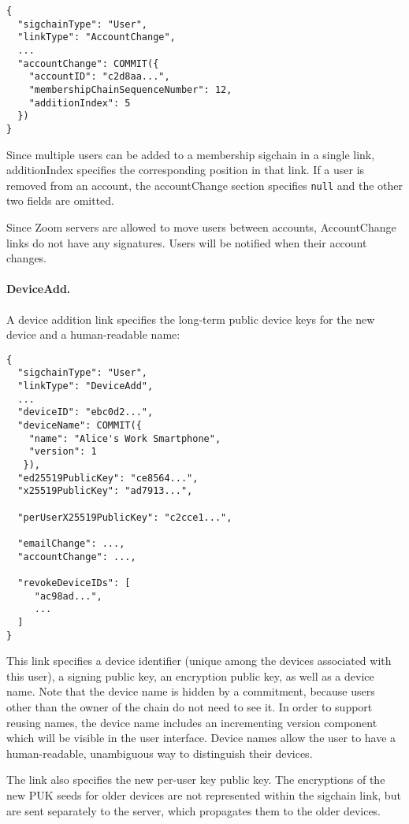 \begin{Verbatim}
{
  "sigchainType": "User",
  "linkType": "AccountChange",
  ...
  "accountChange": COMMIT({
    "accountID": "c2d8aa...",
    "membershipChainSequenceNumber": 12,
    "additionIndex": 5
  })
}
\end{Verbatim}

Since multiple users can be added to a membership sigchain in a single link,
\textsf{additionIndex} specifies the corresponding position in that link. If a user
is removed from an account, the \textsf{accountChange} section specifies \accountID
\texttt{null} and the other two fields are omitted.

Since Zoom servers are allowed to move users between accounts, \textsf{AccountChange} links do
not have any signatures. Users will be notified when their account changes.

\paragraph{DeviceAdd.} A device addition link specifies the long-term public device keys for the new
device and a human-readable name:

\begin{Verbatim}
{
  "sigchainType": "User",
  "linkType": "DeviceAdd",
  ...
  "deviceID": "ebc0d2...",
  "deviceName": COMMIT({
    "name": "Alice's Work Smartphone",
    "version": 1
   }),
  "ed25519PublicKey": "ce8564...",
  "x25519PublicKey": "ad7913...",

  "perUserX25519PublicKey": "c2cce1...",

  "emailChange": ...,
  "accountChange": ...,

  "revokeDeviceIDs": [
     "ac98ad...",
     ...
  ]
}
\end{Verbatim}

This link specifies a device identifier (unique among the devices associated with this user), a
signing public key, an encryption public key, as well as a device name. Note that the device name is
hidden by a commitment, because users other than the owner of the chain do not need to see it. In
order to support reusing names, the device name includes an incrementing version component which
will be visible in the user interface. Device names allow the user to have a human-readable,
unambiguous way to distinguish their devices.

The link also specifies the new per-user key public key. The encryptions of the new PUK seeds for
older devices are not represented within the sigchain link, but are sent separately to the server,
which propagates them to the older devices.

